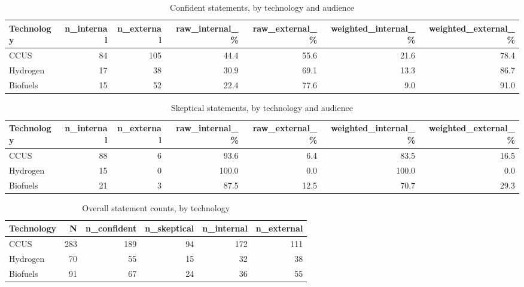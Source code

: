 \begin{table}
\caption{Confident statements, by technology and audience}
\label{tab:stmt-confident}
\begin{tabular}{lrrrrrr}
\toprule
Technology & n\_internal & n\_external & raw\_internal\_\% & raw\_external\_\% & weighted\_internal\_\% & weighted\_external\_\% \\
\midrule
CCUS & 84 & 105 & 44.4 & 55.6 & 21.6 & 78.4 \\
Hydrogen & 17 & 38 & 30.9 & 69.1 & 13.3 & 86.7 \\
Biofuels & 15 & 52 & 22.4 & 77.6 & 9.0 & 91.0 \\
\bottomrule
\end{tabular}
\end{table}

\begin{table}
\caption{Skeptical statements, by technology and audience}
\label{tab:stmt-skeptical}
\begin{tabular}{lrrrrrr}
\toprule
Technology & n\_internal & n\_external & raw\_internal\_\% & raw\_external\_\% & weighted\_internal\_\% & weighted\_external\_\% \\
\midrule
CCUS & 88 & 6 & 93.6 & 6.4 & 83.5 & 16.5 \\
Hydrogen & 15 & 0 & 100.0 & 0.0 & 100.0 & 0.0 \\
Biofuels & 21 & 3 & 87.5 & 12.5 & 70.7 & 29.3 \\
\bottomrule
\end{tabular}
\end{table}

\begin{table}
\caption{Overall statement counts, by technology}
\label{tab:stmt-overall}
\begin{tabular}{lrrrrr}
\toprule
Technology & N & n\_confident & n\_skeptical & n\_internal & n\_external \\
\midrule
CCUS & 283 & 189 & 94 & 172 & 111 \\
Hydrogen & 70 & 55 & 15 & 32 & 38 \\
Biofuels & 91 & 67 & 24 & 36 & 55 \\
\bottomrule
\end{tabular}
\end{table}

